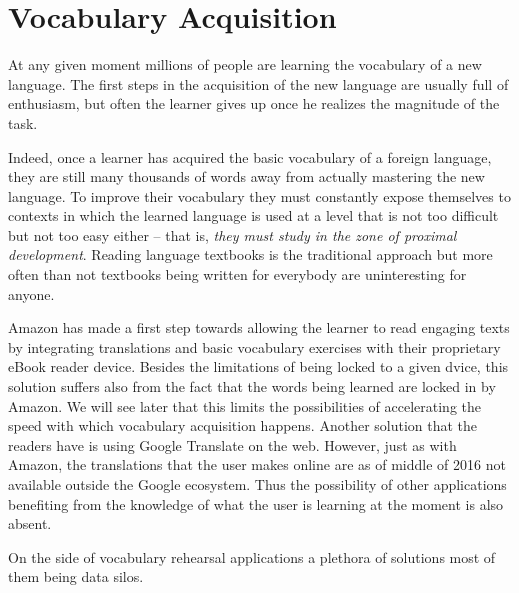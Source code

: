
\section{Vocabulary Acquisition}


At any given moment millions of people are learning the vocabulary of a new language. The first steps in the acquisition of the new language are usually full of enthusiasm, but often the learner gives up once he realizes the magnitude of the task.

Indeed, once a learner has acquired the basic vocabulary of a foreign language, they are still many thousands of words away from actually mastering the new language. To improve their vocabulary they must constantly expose themselves to contexts in which the learned language is used at a level that is not too difficult but not too easy either -- that is, {\em they must study in the zone of proximal development}. Reading language textbooks is the traditional approach but more often than not textbooks being written for everybody are uninteresting for anyone.

Amazon has made a first step towards allowing the learner to read engaging texts by integrating translations and basic vocabulary exercises with their proprietary eBook reader device. Besides the limitations of being locked to a given dvice, this solution suffers also from the fact that the words being learned are locked in by Amazon. We will see later that this limits the possibilities of accelerating the speed with which vocabulary acquisition happens.
Another solution that the readers have is using Google Translate on the web. However, just as with Amazon, the translations that the user makes online are as of middle of 2016 not available outside the Google ecosystem. Thus the possibility of other applications benefiting from the knowledge of what the user is learning at the moment is also absent.

On the side of vocabulary rehearsal applications a plethora of solutions most of them being data silos. 

